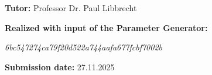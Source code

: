 \vspace*{-6mm}

\begin{large} 
\begin{center}

\end{center}
\end{large} 

\vspace*{5mm}

\begin{large} 
\begin{center}
\textbf{Tutor:} Professor Dr. Paul Libbrecht
\end{center}
\end{large} 

\vspace*{5mm}

\begin{large} 
\begin{center}
\textbf{Realized with input of the Parameter Generator:}

\emph{6bc547274ca79f20d522a744aafa677fcbf7002b}

\end{center}
\end{large} 



\vspace*{5mm}

\begin{large} 
\begin{center}
\textbf{Submission date:} 27.11.2025
\end{center}
\end{large} 


\pagestyle{empty} %


